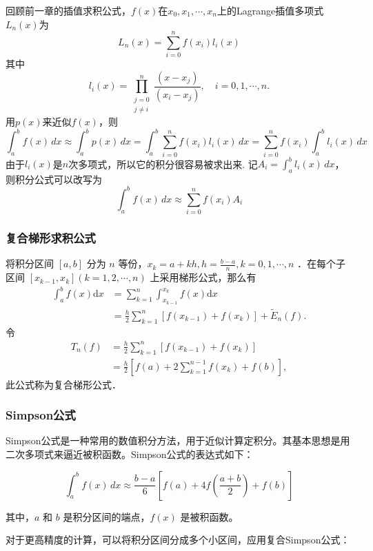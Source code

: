 回顾前一章的插值求积公式，$f(x)$在$x_0,x_1,\cdots,x_n$上的Lagrange插值多项式$L_n(x)$为
\[
    L_n(x)=\sum_{i=0}^n f(x_i) l_i(x)
\]
其中
\[
    l_i(x)=\prod_{\substack{j=0 \\ j \neq i}}^n \frac{\left(x-x_j\right)}{\left(x_i-x_j\right)}, \quad i=0,1, \cdots, n .
\]
用$p(x)$来近似$f(x)$，则
\[
    \int_a^b f(x) \, dx \approx \int_a^b p(x) \, dx = \int_a^b \sum_{i=0}^n f(x_i) l_i(x) \, dx = \sum_{i=0}^n f(x_i) \int_a^b l_i(x) \, dx
\]
由于$l_i(x)$是$n$次多项式，所以它的积分很容易被求出来. 记$A_i=\int_a^b l_i(x) \, dx$，则积分公式可以改写为
\[
    \int_a^b f(x) \, dx \approx \sum_{i=0}^n f(x_i) A_i
\]

\subsubsection{复合梯形求积公式}

将积分区间 $[a, b]$ 分为 $n$ 等份，$x_k=a+k h, h=\frac{b-a}{n}, k=0,1, \cdots, n$ ．在每个子区间 $\left[x_{k-1}, x_k\right](k=1,2, \cdots, n)$ 上采用梯形公式，那么有
$$
    \begin{aligned}
        \int_a^b f(x) \mathrm{d} x & =\sum_{k=1}^n \int_{x_{k-1}}^{x_k} f(x) \mathrm{d} x                                               \\
                                   & =\frac{h}{2} \sum_{k=1}^n\left[f\left(x_{k-1}\right)+f\left(x_k\right)\right]+\widetilde{E}_n(f) .
    \end{aligned}
$$
令
$$
    \begin{aligned}
        T_n(f) & =\frac{h}{2} \sum_{k=1}^n\left[f\left(x_{k-1}\right)+f\left(x_k\right)\right] \\
               & =\frac{h}{2}\left[f(a)+2 \sum_{k=1}^{n-1} f\left(x_k\right)+f(b)\right],
    \end{aligned}
$$
此公式称为复合梯形公式．

\subsubsection{Simpson公式}

Simpson公式是一种常用的数值积分方法，用于近似计算定积分。其基本思想是用二次多项式来逼近被积函数。Simpson公式的表达式如下：

\[
    \int_a^b f(x) \, dx \approx \frac{b-a}{6} \left[ f(a) + 4f\left( \frac{a+b}{2} \right) + f(b) \right]
\]

其中，$a$ 和 $b$ 是积分区间的端点，$f(x)$ 是被积函数。

对于更高精度的计算，可以将积分区间分成多个小区间，应用复合Simpson公式：

